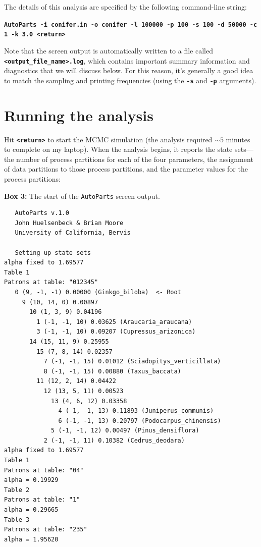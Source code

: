 \documentclass[11pt]{article}
\newcommand{\cl}[1]{{\texttt{\textbf{#1}}}}
\begin{document}
The details of this analysis are specified by the following command-line string:

\cl{AutoParts -i conifer.in -o conifer -l 100000 -p 100 -s 100 -d 50000 -c 1 -k 3.0 <return>}

Note that the screen output is automatically written to a file called \cl{<output\_file\_name>.log}, which contains important summary information and diagnostics that we will discuss below.
For this reason, 
it's generally a good idea to match the sampling and printing frequencies (using the \cl{-s} and \cl{-p} arguments).


\newpage
\section*{Running the analysis}

Hit \cl{<return>} to start the MCMC simulation (the analysis required $\sim 5$ minutes to complete on my laptop).
When the analysis begins, it reports the state sets---the number of process partitions for each of the four parameters, the assignment of data partitions to those process partitions, and the parameter values for the process partitions:

\begin{center}
{\bf Box 3:} The start of the \verb!AutoParts! screen output. \\
\end{center}
{\tt \scriptsize \begin{framed}
\begin{lstlisting}
   AutoParts v.1.0
   John Huelsenbeck & Brian Moore
   University of California, Bervis

   Setting up state sets
alpha fixed to 1.69577
Table 1
Patrons at table: "012345"
   0 (9, -1, -1) 0.00000 (Ginkgo_biloba)  <- Root
     9 (10, 14, 0) 0.00897
       10 (1, 3, 9) 0.04196
         1 (-1, -1, 10) 0.03625 (Araucaria_araucana) 
         3 (-1, -1, 10) 0.09207 (Cupressus_arizonica) 
       14 (15, 11, 9) 0.25955
         15 (7, 8, 14) 0.02357
           7 (-1, -1, 15) 0.01012 (Sciadopitys_verticillata) 
           8 (-1, -1, 15) 0.00880 (Taxus_baccata) 
         11 (12, 2, 14) 0.04422
           12 (13, 5, 11) 0.00523
             13 (4, 6, 12) 0.03358
               4 (-1, -1, 13) 0.11893 (Juniperus_communis) 
               6 (-1, -1, 13) 0.20797 (Podocarpus_chinensis) 
             5 (-1, -1, 12) 0.00497 (Pinus_densiflora) 
           2 (-1, -1, 11) 0.10382 (Cedrus_deodara) 
alpha fixed to 1.69577
Table 1
Patrons at table: "04"
alpha = 0.19929
Table 2
Patrons at table: "1"
alpha = 0.29665
Table 3
Patrons at table: "235"
alpha = 1.95620
\end{lstlisting}
\end{framed}}
\end{document}
